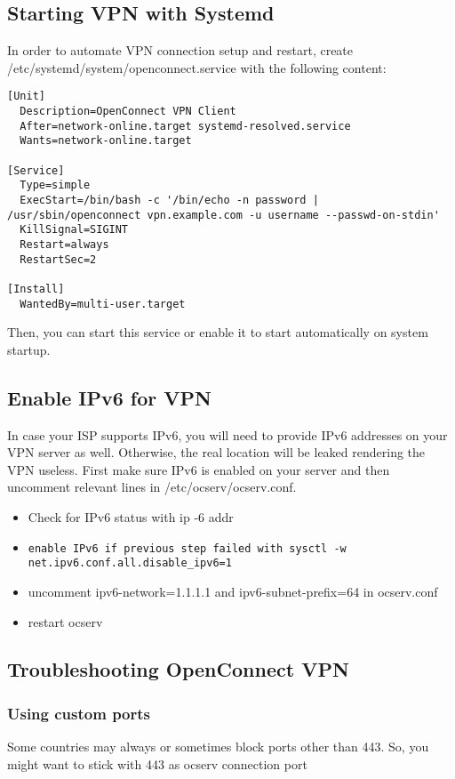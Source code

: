 \documentclass{article}
\begin{document}
\subsection{Starting VPN with Systemd}
In order to automate VPN connection setup and restart, create /etc/systemd/system/openconnect.service with the following content:
\begin{lstlisting}
[Unit]
  Description=OpenConnect VPN Client
  After=network-online.target systemd-resolved.service
  Wants=network-online.target

[Service]
  Type=simple
  ExecStart=/bin/bash -c '/bin/echo -n password | /usr/sbin/openconnect vpn.example.com -u username --passwd-on-stdin'
  KillSignal=SIGINT
  Restart=always
  RestartSec=2

[Install]
  WantedBy=multi-user.target

\end{lstlisting}

Then, you can start this service or enable it to start automatically on system startup. 

\subsection{Enable IPv6 for VPN}
In case your ISP supports IPv6, you will need to provide IPv6 addresses on your VPN server as well. Otherwise, the real location will be leaked rendering the VPN useless. First make sure IPv6 is enabled on your server and then uncomment relevant lines in /etc/ocserv/ocserv.conf.  
\begin{itemize}
	\item Check for IPv6 status with ip -6 addr
	\item \lstinline{enable IPv6 if previous step failed with sysctl -w net.ipv6.conf.all.disable_ipv6=1}
	\item uncomment ipv6-network=1.1.1.1 and ipv6-subnet-prefix=64 in ocserv.conf
	\item restart ocserv
\end{itemize}

\subsection{Troubleshooting OpenConnect VPN}
	
	\subsubsection{Using custom ports}
	Some countries may always or sometimes block ports other than 443. So, you might want to stick with 443 as ocserv connection port
\end{document}
